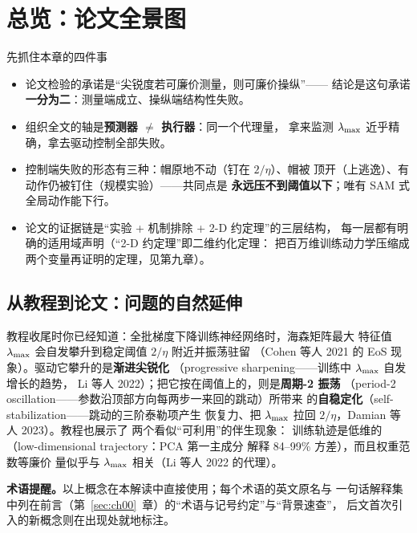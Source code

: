 \section{总览：论文全景图}\label{sec:ch01}

\begin{keybox}{先抓住本章的四件事}
\begin{itemize}
  \item 论文检验的承诺是``尖锐度若可廉价测量，则可廉价操纵''——
        结论是这句承诺\textbf{一分为二}：测量端成立、操纵端结构性失败。
  \item 组织全文的轴是\textbf{预测器 $\neq$ 执行器}：同一个代理量，
        拿来监测 $\lambda_{\max}$ 近乎精确，拿去驱动控制全部失败。
  \item 控制端失败的形态有三种：帽原地不动（钉在 $2/\eta$）、帽被
        顶开（上逃逸）、有动作仍被钉住（规模实验）——共同点是
        \textbf{永远压不到阈值以下}；唯有 SAM 式全局动作能下行。
  \item 论文的证据链是``实验 + 机制排除 + 2-D 约定理''的三层结构，
        每一层都有明确的适用域声明（``2-D 约定理''即二维约化定理：
        把百万维训练动力学压缩成两个变量再证明的定理，见第九章）。
\end{itemize}
\end{keybox}

\subsection{从教程到论文：问题的自然延伸}\label{sec:ch01-question}

教程收尾时你已经知道：全批梯度下降训练神经网络时，海森矩阵最大
特征值 $\lambda_{\max}$ 会自发攀升到稳定阈值 $2/\eta$ 附近并振荡驻留
（Cohen 等人 2021 的 EoS 现象）。驱动它攀升的是\textbf{渐进尖锐化}
（progressive sharpening——训练中 $\lambda_{\max}$ 自发增长的趋势，
Li 等人 2022）；把它按在阈值上的，则是\textbf{周期-2 振荡}
（period-2 oscillation——参数沿顶部方向每两步一来回的跳动）所带来
的\textbf{自稳定化}（self-stabilization——跳动的三阶泰勒项产生
恢复力、把 $\lambda_{\max}$ 拉回 $2/\eta$，Damian 等人 2023）。教程也展示了
两个看似``可利用''的伴生现象：
训练轨迹是低维的（low-dimensional trajectory：PCA 第一主成分
解释 84--99\% 方差），而且权重范数等廉价
量似乎与 $\lambda_{\max}$ 相关（Li 等人 2022 的代理）。

\textbf{术语提醒。}以上概念在本解读中直接使用；每个术语的英文原名与
一句话解释集中列在前言（第~\ref{sec:ch00}~章）的``术语与记号约定''与``背景速查''，
后文首次引入的新概念则在出现处就地标注。

